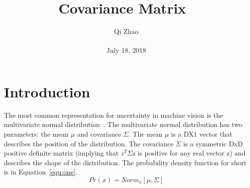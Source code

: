 \documentclass[10pt,twocolumn,letterpaper]{article}
\begin{document}
\title{Covariance Matrix~\cite{Andrews1991Heteroskedasticity}}
\author{Qi Zhao\\\\July 18, 2018}

\maketitle
\section{Introduction}
The most common representation for uncertainty in machine vision is the multivariate normal distribution~\cite{Azzalini1996The}. The multivariate normal distribution has two parameters: the mean $\mu$ and covariance $\Sigma$. The mean $\mu$ is a DX1 vector that describes the position of the distribution. The covariance $\Sigma$ is a symmetric DxD positive definite matrix (implying that $z^T$$\Sigma$z is positive for any real vector z) and describes the shape of the distribution. The probability density function for short is in Equation~\ref{equ:one}.
\begin{equation}\label{equ:one}
Pr(x) = Norm_x[\mu, \Sigma]
\end{equation}
\end{document}
